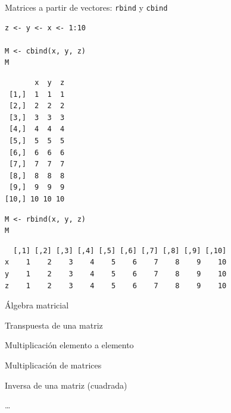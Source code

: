 \documentclass[xcolor={usenames,svgnames,dvipsnames}]{beamer}
\begin{document}
\begin{frame}[fragile,label={sec:org7e5d8db}]{Matrices a partir de vectores: \texttt{rbind} y \texttt{cbind}}
 \lstset{language=r,label= ,caption= ,captionpos=b,numbers=none}
\begin{lstlisting}
z <- y <- x <- 1:10

M <- cbind(x, y, z)
M
\end{lstlisting}

\begin{verbatim}
       x  y  z
 [1,]  1  1  1
 [2,]  2  2  2
 [3,]  3  3  3
 [4,]  4  4  4
 [5,]  5  5  5
 [6,]  6  6  6
 [7,]  7  7  7
 [8,]  8  8  8
 [9,]  9  9  9
[10,] 10 10 10
\end{verbatim}

\lstset{language=r,label= ,caption= ,captionpos=b,numbers=none}
\begin{lstlisting}
M <- rbind(x, y, z)
M
\end{lstlisting}

\begin{verbatim}
  [,1] [,2] [,3] [,4] [,5] [,6] [,7] [,8] [,9] [,10]
x    1    2    3    4    5    6    7    8    9    10
y    1    2    3    4    5    6    7    8    9    10
z    1    2    3    4    5    6    7    8    9    10
\end{verbatim}
\end{frame}

\begin{frame}[fragile,label={sec:orgc851889}]{Álgebra matricial}
 \begin{description}
\item[{\texttt{t()}}] Transpuesta de una matriz
\item[{\texttt{*}}] Multiplicación elemento a elemento
\item[{\texttt{\%*\%}}] Multiplicación de matrices
\item[{\texttt{solve(A)}}] Inversa de una matriz (cuadrada)
\item \ldots{}
\end{description}
\end{frame}
\end{document}
